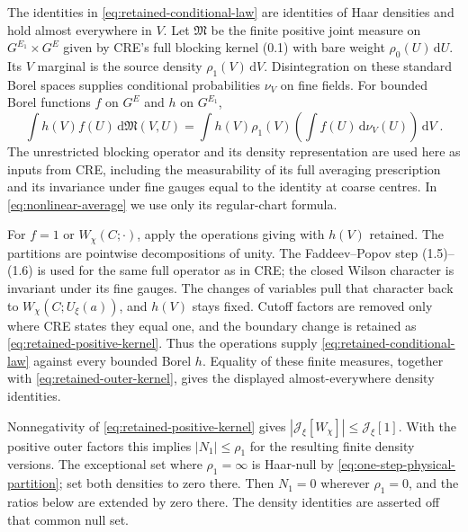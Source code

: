 \documentclass[11pt]{article}
\newcommand{\dd}{\mathrm{d}}
\begin{document}
The identities in \eqref{eq:retained-conditional-law} are identities of Haar densities and hold almost everywhere in $V$. Let $\mathfrak M$ be the finite positive joint measure on $G^{E_1}\times G^E$ given by CRE's full blocking kernel (0.1) with bare weight $\rho_0(U)\,\dd U$. Its $V$ marginal is the source density $\rho_1(V)\,\dd V$. Disintegration on these standard Borel spaces supplies conditional probabilities $\nu_V$ on fine fields. For bounded Borel functions $f$ on $G^E$ and $h$ on $G^{E_1}$,
\begin{equation}\label{eq:retained-disintegration}
    \int h(V)f(U)\,\dd\mathfrak M(V,U)
        =\int h(V)\rho_1(V)
            \left(\int f(U)\,\dd\nu_V(U)\right)\,\dd V\;.
\end{equation}
The unrestricted blocking operator and its density representation are used here as inputs from CRE, including the measurability of its full averaging prescription and its invariance under fine gauges equal to the identity at coarse centres. In \eqref{eq:nonlinear-average} we use only its regular-chart formula.

For $f=1$ or $W_\chi(C;\cdot)$, apply the operations giving \cite[(1.5)--(1.15), (1.18)--(1.25)]{BalabanCRE} with $h(V)$ retained. The partitions are pointwise decompositions of unity. The Faddeev--Popov step (1.5)--(1.6) is used for the same full operator as in CRE; the closed Wilson character is invariant under its fine gauges. The changes of variables pull that character back to $W_\chi(C;U_\xi(a))$, and $h(V)$ stays fixed. Cutoff factors are removed only where CRE states they equal one, and the boundary change is retained as \eqref{eq:retained-positive-kernel}. Thus the operations supply \eqref{eq:retained-conditional-law} against every bounded Borel $h$. Equality of these finite measures, together with \eqref{eq:retained-outer-kernel}, gives the displayed almost-everywhere density identities.

Nonnegativity of \eqref{eq:retained-positive-kernel} gives $|\mathcal J_\xi[W_\chi]|\leq\mathcal J_\xi[1]$. With the positive outer factors this implies $|N_1|\leq\rho_1$ for the resulting finite density versions. The exceptional set where $\rho_1=\infty$ is Haar-null by \eqref{eq:one-step-physical-partition}; set both densities to zero there. Then $N_1=0$ wherever $\rho_1=0$, and the ratios below are extended by zero there. The density identities are asserted off that common null set.
\end{document}
